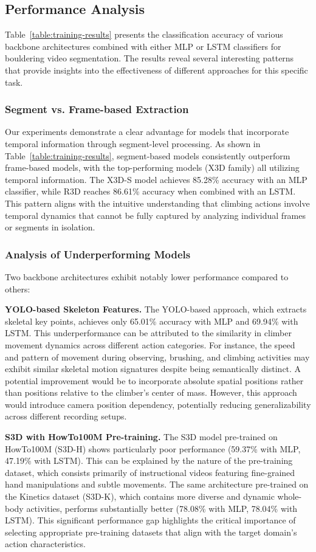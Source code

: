 \subsection{Performance Analysis}
Table~\ref{table:training-results} presents the classification accuracy of various backbone architectures combined with either MLP or LSTM classifiers for bouldering video segmentation. The results reveal several interesting patterns that provide insights into the effectiveness of different approaches for this specific task.

\subsubsection{Segment vs. Frame-based Extraction}
Our experiments demonstrate a clear advantage for models that incorporate temporal information through segment-level processing. As shown in Table~\ref{table:training-results}, segment-based models consistently outperform frame-based models, with the top-performing models (X3D family) all utilizing temporal information. The X3D-S model achieves 85.28\% accuracy with an MLP classifier, while R3D reaches 86.61\% accuracy when combined with an LSTM. This pattern aligns with the intuitive understanding that climbing actions involve temporal dynamics that cannot be fully captured by analyzing individual frames or segments in isolation.

\subsubsection{Analysis of Underperforming Models}
Two backbone architectures exhibit notably lower performance compared to others:

\noindent\textbf{YOLO-based Skeleton Features.}
The YOLO-based approach, which extracts skeletal key points, achieves only 65.01\% accuracy with MLP and 69.94\% with LSTM. This underperformance can be attributed to the similarity in climber movement dynamics across different action categories. For instance, the speed and pattern of movement during observing, brushing, and climbing activities may exhibit similar skeletal motion signatures despite being semantically distinct. A potential improvement would be to incorporate absolute spatial positions rather than positions relative to the climber's center of mass. However, this approach would introduce camera position dependency, potentially reducing generalizability across different recording setups.

\noindent\textbf{S3D with HowTo100M Pre-training.}
The S3D model pre-trained on HowTo100M (S3D-H) shows particularly poor performance (59.37\% with MLP, 47.19\% with LSTM). This can be explained by the nature of the pre-training dataset, which consists primarily of instructional videos featuring fine-grained hand manipulations and subtle movements. The same architecture pre-trained on the Kinetics dataset (S3D-K), which contains more diverse and dynamic whole-body activities, performs substantially better (78.08\% with MLP, 78.04\% with LSTM). This significant performance gap highlights the critical importance of selecting appropriate pre-training datasets that align with the target domain's action characteristics.

